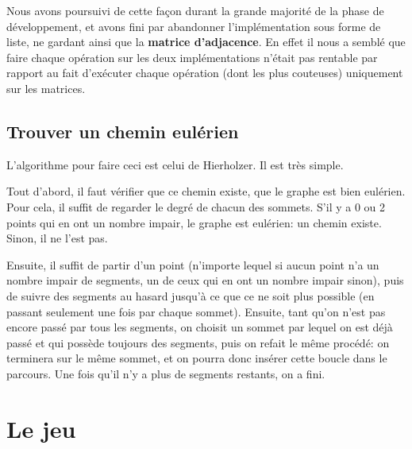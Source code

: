 \documentclass[12pt]{article}
\begin{document}
Nous avons poursuivi de cette façon durant la grande majorité de la phase de développement, et avons fini par abandonner l'implémentation sous forme de liste, ne gardant ainsi que la {\bf matrice d'adjacence}. En effet il nous a semblé que faire chaque opération sur les deux implémentations n'était pas rentable par rapport au fait d'exécuter chaque opération (dont les plus couteuses) uniquement sur les matrices.

\subsection{Trouver un chemin eulérien}

L'algorithme pour faire ceci est celui de Hierholzer. Il est très simple.

Tout d'abord, il faut vérifier que ce chemin existe, que le graphe est bien eulérien. Pour cela, il suffit de regarder le degré de chacun des sommets. S'il y a 0 ou 2 points qui en ont un nombre impair, le graphe est eulérien: un chemin existe. Sinon, il ne l'est pas.

Ensuite, il suffit de partir d'un point (n'importe lequel si aucun point n'a un nombre impair de segments, un de ceux qui en ont un nombre impair sinon), puis de suivre des segments au hasard jusqu'à ce que ce ne soit plus possible (en passant seulement une fois par chaque sommet). Ensuite, tant qu'on n'est pas encore passé par tous les segments, on choisit un sommet par lequel on est déjà passé et qui possède toujours des segments, puis on refait le même procédé: on terminera sur le même sommet, et on pourra donc insérer cette boucle dans le parcours. Une fois qu'il n'y a plus de segments restants, on a fini.

\section{Le jeu}
\end{document}
